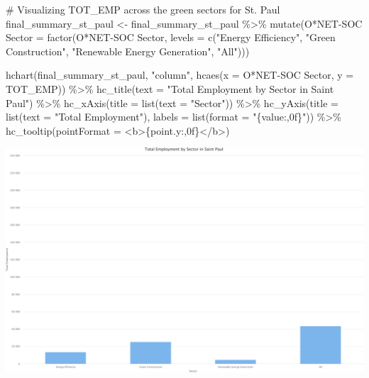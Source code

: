 \documentclass[
  letterpaper,
  DIV=11,
  numbers=noendperiod]{scrartcl}
\newenvironment{Shaded}{\begin{snugshade}}{\end{snugshade}}
\newcommand{\AttributeTok}[1]{\textcolor[rgb]{0.40,0.45,0.13}{#1}}
\newcommand{\CommentTok}[1]{\textcolor[rgb]{0.37,0.37,0.37}{#1}}
\newcommand{\FunctionTok}[1]{\textcolor[rgb]{0.28,0.35,0.67}{#1}}
\newcommand{\NormalTok}[1]{\textcolor[rgb]{0.00,0.23,0.31}{#1}}
\newcommand{\OtherTok}[1]{\textcolor[rgb]{0.00,0.23,0.31}{#1}}
\newcommand{\SpecialCharTok}[1]{\textcolor[rgb]{0.37,0.37,0.37}{#1}}
\newcommand{\StringTok}[1]{\textcolor[rgb]{0.13,0.47,0.30}{#1}}
\begin{document}
\begin{Shaded}
\begin{Highlighting}[]
\CommentTok{\# Visualizing TOT\_EMP across the green sectors for St. Paul}
\NormalTok{final\_summary\_st\_paul }\OtherTok{\textless{}{-}}\NormalTok{ final\_summary\_st\_paul }\SpecialCharTok{\%\textgreater{}\%}
  \FunctionTok{mutate}\NormalTok{(}\StringTok{\textasciigrave{}}\AttributeTok{O*NET{-}SOC Sector}\StringTok{\textasciigrave{}} \OtherTok{=} \FunctionTok{factor}\NormalTok{(}\StringTok{\textasciigrave{}}\AttributeTok{O*NET{-}SOC Sector}\StringTok{\textasciigrave{}}\NormalTok{, }\AttributeTok{levels =} \FunctionTok{c}\NormalTok{(}\StringTok{"Energy Efficiency"}\NormalTok{, }\StringTok{"Green Construction"}\NormalTok{, }\StringTok{"Renewable Energy Generation"}\NormalTok{, }\StringTok{"All"}\NormalTok{)))}

\FunctionTok{hchart}\NormalTok{(final\_summary\_st\_paul, }\StringTok{"column"}\NormalTok{, }\FunctionTok{hcaes}\NormalTok{(}\AttributeTok{x =} \StringTok{\textasciigrave{}}\AttributeTok{O*NET{-}SOC Sector}\StringTok{\textasciigrave{}}\NormalTok{, }\AttributeTok{y =}\NormalTok{ TOT\_EMP)) }\SpecialCharTok{\%\textgreater{}\%}
  \FunctionTok{hc\_title}\NormalTok{(}\AttributeTok{text =} \StringTok{"Total Employment by Sector in Saint Paul"}\NormalTok{) }\SpecialCharTok{\%\textgreater{}\%}
  \FunctionTok{hc\_xAxis}\NormalTok{(}\AttributeTok{title =} \FunctionTok{list}\NormalTok{(}\AttributeTok{text =} \StringTok{"Sector"}\NormalTok{)) }\SpecialCharTok{\%\textgreater{}\%}
  \FunctionTok{hc\_yAxis}\NormalTok{(}\AttributeTok{title =} \FunctionTok{list}\NormalTok{(}\AttributeTok{text =} \StringTok{"Total Employment"}\NormalTok{), }\AttributeTok{labels =} \FunctionTok{list}\NormalTok{(}\AttributeTok{format =} \StringTok{"\{value:,0f\}"}\NormalTok{)) }\SpecialCharTok{\%\textgreater{}\%}
  \FunctionTok{hc\_tooltip}\NormalTok{(}\AttributeTok{pointFormat =} \StringTok{\textquotesingle{}\textless{}b\textgreater{}\{point.y:,0f\}\textless{}/b\textgreater{}\textquotesingle{}}\NormalTok{)}
\end{Highlighting}
\end{Shaded}

\includegraphics{index_files/figure-pdf/unnamed-chunk-20-1.pdf}
\end{document}
